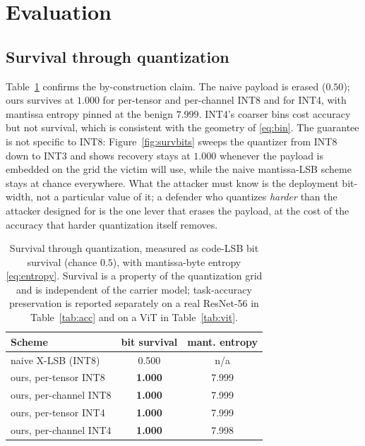 \documentclass[10pt,journal]{IEEEtran}
\theoremstyle{remark}
\begin{document}
\section{Evaluation}\label{sec:eval}
\subsection{Survival through quantization}
Table~\ref{tab:survive} confirms the by-construction claim. The naive payload is erased
($0.50$); ours survives at $1.000$ for per-tensor and per-channel INT8 and for INT4,
with mantissa entropy pinned at the benign $7.999$. INT4's coarser bins cost accuracy
but not survival, which is consistent with the geometry of \eqref{eq:bin}. The guarantee
is not specific to INT8: Figure~\ref{fig:survbits} sweeps the quantizer from INT8 down to
INT3 and shows recovery stays at $1.000$ whenever the payload is embedded on the grid the
victim will use, while the naive mantissa-LSB scheme stays at chance everywhere. What the
attacker must know is the deployment bit-width, not a particular value of it; a defender
who quantizes \emph{harder} than the attacker designed for is the one lever that erases the
payload, at the cost of the accuracy that harder quantization itself removes.

\begin{table}[!tb]\centering
\caption{Survival through quantization, measured as code-LSB bit survival (chance $0.5$),
with mantissa-byte entropy \eqref{eq:entropy}. Survival is a property of the quantization
grid and is independent of the carrier model; task-accuracy preservation is reported
separately on a real ResNet-56 in Table~\ref{tab:acc} and on a ViT in Table~\ref{tab:vit}.}
\label{tab:survive}
\begin{tabular*}{\columnwidth}{@{\extracolsep{\fill}}lcc@{}}
\toprule
Scheme & bit survival & mant. entropy\\
\midrule
naive X-LSB (INT8) & 0.500 & n/a\\
ours, per-tensor INT8 & \textbf{1.000} & 7.999\\
ours, per-channel INT8 & \textbf{1.000} & 7.999\\
ours, per-tensor INT4 & \textbf{1.000} & 7.999\\
ours, per-channel INT4 & \textbf{1.000} & 7.998\\
\bottomrule
\end{tabular*}
\end{table}
\end{document}

